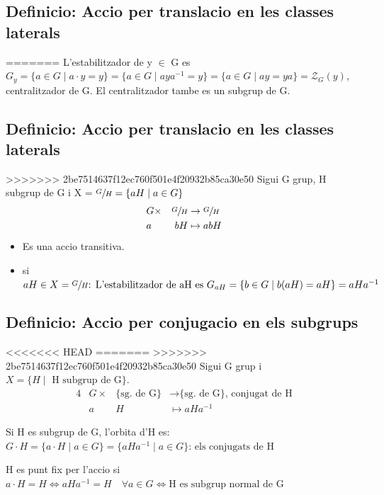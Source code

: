 \documentclass[11pt]{article}
\begin{document}
\subsection{Definicio: Accio per translacio en les classes laterals}
\label{sec:org037ba11}
=======
\label{sec:org5d4a4c0}
L'estabilitzador de y \(\in\) G es \(G_y = \{a \in G \mid a \cdot y = y \} = \{ a \in G \mid aya^{-1} = y \} = \{ a \in G \mid ay = ya \} = \mathcal{Z}_{G}(y)\),  centralitzador de G. El centralitzador tambe es un subgrup de G.

\subsection{Definicio: Accio per translacio en les classes laterals}
\label{sec:orgf2deb0f}
>>>>>>> 2be7514637f12ec760f501e4f20932b85ca30e50
Sigui G grup, H subgrup de G i X = \(\sfrac{G}{H} = \{ aH \mid a \in G\}\)
\begin{alignat*}{4}
&G \times &\sfrac{G}{H} &\to \sfrac{G}{H} \\
&a &bH &\mapsto abH
\end{alignat*}

\begin{itemize}
\item Es una accio transitiva.
\item si \(aH \in X = \sfrac{G}{H} \text{: L'estabilitzador de aH es } G_{aH} = \{ b \in G \mid b(aH) = aH \} = aHa^{-1}\)
\end{itemize}


\subsection{Definicio: Accio per conjugacio en els subgrups}
<<<<<<< HEAD
\label{sec:orga6bd431}
=======
\label{sec:org9dc0b9e}
>>>>>>> 2be7514637f12ec760f501e4f20932b85ca30e50
Sigui G grup i \(X = \{ H \mid \text{ H subgrup de G} \}.\)
\begin{alignat*}{4}
&G \times &\text{\{sg. de G\}} &\to \text{\{sg. de G\}, conjugat de H} \\
&a &H &\mapsto aHa^{-1}
\end{alignat*}

Si H es subgrup de G, l'orbita d'H es: \\
\(G\cdot H =\{a \cdot H\mid a\in G \} = \{aHa^{-1} \mid a \in G \} \text{: els conjugats de H}\)


H es punt fix per l'accio si \(a \cdot H = H \iff aHa^{-1} = H \quad \forall a \in G \iff \text{H es subgrup normal de G}\)
\end{document}
